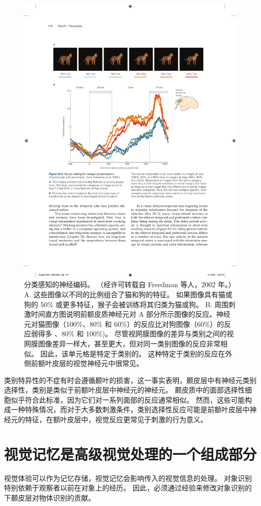 \begin{figure}[htbp]
	\centering
	\includegraphics[width=0.9\linewidth]{chap24/fig_24_8}
	\caption{分类感知的神经编码。 （经许可转载自 Freedman 等人，2002 年。） A. 这些图像以不同的比例组合了猫和狗的特征。 如果图像具有猫或狗的 50\% 或更多特征，猴子会被训练将其归类为猫或狗。 B. 周围刺激时间直方图说明前额皮质神经元对 A 部分所示图像的反应。神经元对猫图像（100\%、80\% 和 60\%）的反应比对狗图像（60\%）的反应弱得多 、80\% 和 100\%)。 尽管视网膜图像的差异与类别之间的视网膜图像差异一样大，甚至更大，但对同一类别图像的反应非常相似。 因此，该单元格是特定于类别的。 这种特定于类别的反应在外侧前额叶皮层的视觉神经元中很常见。}
	\label{fig:24_8}
\end{figure}

类别特异性的不症有时会遵循颞叶的损害，这一事实表明，颞皮层中有神经元类别选择性，类别是类似于前额叶皮层中神经元的神经元。
颞皮质中的面部选择性细胞似乎符合此标准，因为它们对一系列面部的反应通常相似。
然而，这些可能构成一种特殊情况，而对于大多数刺激条件，类别选择性反应可能是前额叶皮层中神经元的特征，在额叶皮层中，视觉反应更常见于刺激的行为意义。


\section{视觉记忆是高级视觉处理的一个组成部分}
视觉体验可以作为记忆存储，视觉记忆会影响传入的视觉信息的处理。
对象识别特别依赖于观察者以前在对象上的经历。
因此，必须通过经验来修改对象识别的下颞皮层对物体识别的贡献。


